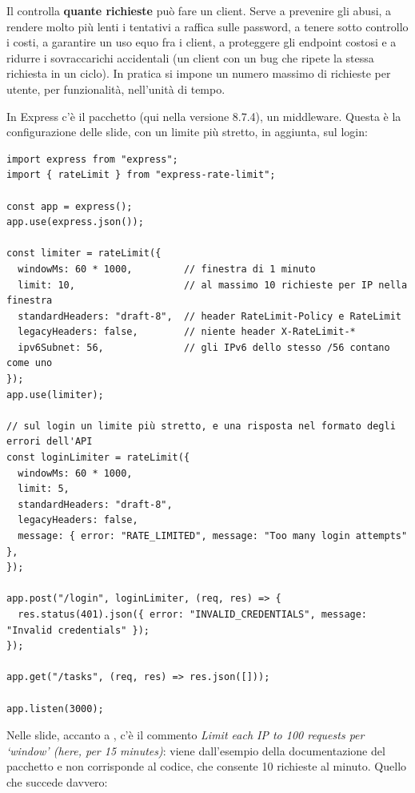 Il  controlla \textbf{quante richieste} può fare un client.
Serve a prevenire gli abusi, a rendere molto più lenti i tentativi a raffica
sulle password, a tenere sotto controllo i costi, a garantire un uso equo fra i
client, a proteggere gli endpoint costosi e a ridurre i sovraccarichi
accidentali (un client con un bug che ripete la stessa richiesta in un ciclo).
In pratica si impone un numero massimo di richieste per utente, per
funzionalità, nell'unità di tempo.

In Express c'è il pacchetto  (qui nella versione
8.7.4), un middleware. Questa è la configurazione delle slide, con un limite
più stretto, in aggiunta, sul login:

\begin{lstlisting}[style=js, name=limiti.js]
import express from "express";
import { rateLimit } from "express-rate-limit";

const app = express();
app.use(express.json());

const limiter = rateLimit({
  windowMs: 60 * 1000,         // finestra di 1 minuto
  limit: 10,                   // al massimo 10 richieste per IP nella finestra
  standardHeaders: "draft-8",  // header RateLimit-Policy e RateLimit
  legacyHeaders: false,        // niente header X-RateLimit-*
  ipv6Subnet: 56,              // gli IPv6 dello stesso /56 contano come uno
});
app.use(limiter);

// sul login un limite più stretto, e una risposta nel formato degli errori dell'API
const loginLimiter = rateLimit({
  windowMs: 60 * 1000,
  limit: 5,
  standardHeaders: "draft-8",
  legacyHeaders: false,
  message: { error: "RATE_LIMITED", message: "Too many login attempts" },
});

app.post("/login", loginLimiter, (req, res) => {
  res.status(401).json({ error: "INVALID_CREDENTIALS", message: "Invalid credentials" });
});

app.get("/tasks", (req, res) => res.json([]));

app.listen(3000);
\end{lstlisting}

Nelle slide, accanto a , c'è il commento \textit{Limit each IP
to 100 requests per `window' (here, per 15 minutes)}: viene dall'esempio della
documentazione del pacchetto e non corrisponde al codice, che consente 10
richieste al minuto. Quello che succede davvero:

